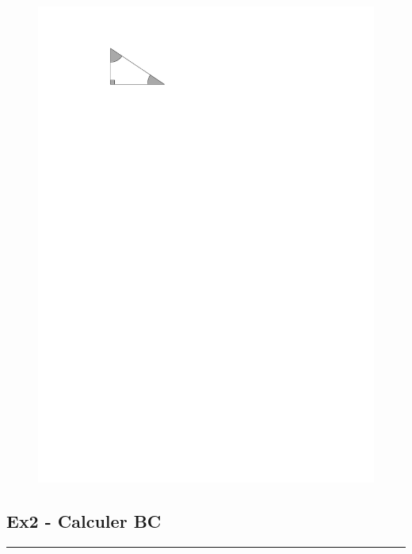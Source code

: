 \documentclass[12pt]{article}
\newcommand{\horrule}[1]{\rule{\linewidth}{#1}} %
\newcommand{\Pointille}[1][3]{\multido{}{#1}{ \makebox[\linewidth]{\dotfill}\\[\parskip]}}
\begin{document}
\begin{multicols}{2}

  \begin{figure}[H]
    \centering
    \includegraphics[width=0.6\linewidth]{sources/2/exo2.pdf}
  \end{figure}
  
  \subsection*{Ex2 - Calculer BC}
  
  \Pointille[6]

\end{multicols}

\horrule{0.5pt}
\end{document}
